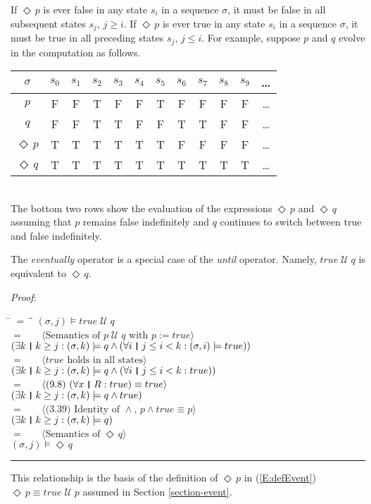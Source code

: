 \documentclass[12pt, fleqn, leqno]{article}
\newcommand{\lgap}{2pt}                             %
\newcommand{\lllgap}{12pt}                          %
\newcommand{\mymathindent}{24pt}                    %
\newcommand{\Until}{\;\mathcal{U}\;}
\newcommand{\Event}{\Diamond\,}
\newcommand{\myqed}{\rule[-.23ex]{1.2ex}{2.0ex}}
\newcommand{\myqedtab}{\hspace{384pt}}              %
\newcommand{\thedr}{\rule[-.25ex]{.32mm}{1.75ex}}   %
\newcommand{\dr}{\;\,\thedr\,\;}                    %
\newcommand{\rb}{:}                                 %
\newcommand{\all}{\forall}                          %
\newcommand{\ext}{\exists}                          %
\newcommand{\Gll} {\langle}                         %
\newcommand{\Ggg} {\rangle}                         %
\newcommand{\Hint}[1]     {\ \ \ $\Gll              \mbox{#1} \Ggg$ }   %
\begin{document}
If $\Event p$ is ever false in any state $s_i$ in a sequence $\sigma$, it must be false in all subsequent states $s_j$, $j\ge i$.
If $\Event p$ is ever true in any state $s_i$ in a sequence $\sigma$, it must be true in all preceding states $s_j$, $j\le i$.
For example, suppose $p$ and $q$ evolve in the computation as follows.\\[\lllgap]
\begin{tabular}{c|ccccccccccc}
  $\sigma$       & $s_0$ & $s_1$ & $s_2$ & $s_3$ & $s_4$ & $s_5$ & $s_6$ & $s_7$ & $s_8$& $s_9$  & \dots \\
  \hline
  $p$            & F     & F     & T     & F     & F     & T     & F     & F     & F     & F     &  \dots\\
  $q$            & F     & F     & T     & T     & F     & F     & T     & T     & F     & F     &  \dots\\
  $\Event p$     & T     & T     & T     & T     & T     & T     & F     & F     & F     & F     &  \dots\\
  $\Event q$     & T     & T     & T     & T     & T     & T     & T     & T     & T     & T     &  \dots\\
\end{tabular}\\[\lllgap]
The bottom two rows show the evaluation of the expressions $\Event p$ and $\Event q$
assuming that $p$ remains false indefinitely and $q$ continues to switch between true and false indefinitely.

The \textit{eventually} operator is a special case of the \textit{until} operator.
Namely, $true \Until q$ is equivalent to $\Event q$.

\emph{Proof}:
\begin{tabbing}
\hspace{\mymathindent} \= $= \;$ \= \myqedtab \= \kill
	\> \>   $(\sigma, j) \models true\Until q$\\[\lgap]
	\> $=$  \>  \Hint{Semantics of $p\Until q$ with $p:=true$}\\[\lgap]
	\> \>   $(\ext k \dr k \ge j \rb (\sigma,k) \models q \land (\all i \dr j\le i < k \rb (\sigma,i) \models true))$\\[\lgap]
	\> $=$  \>  \Hint{$true$ holds in all states}\\[\lgap]
	\> \>   $(\ext k \dr k \ge j \rb (\sigma,k) \models q \land (\all i \dr j\le i < k \rb true))$\\[\lgap]
	\> $=$  \>  \Hint{(9.8) $(\all x\dr R\rb true)\equiv true$}\\[\lgap]
	\> \>   $(\ext k \dr k \ge j \rb (\sigma,k) \models q \land true)$\\[\lgap]
	\> $=$  \>  \Hint{(3.39) Identity of $\land$, $p \land true \equiv p$}\\[\lgap]
	\> \>   $(\ext k \dr k \ge j \rb (\sigma,k) \models q)$\\[\lgap]
	\> $=$  \>  \Hint{Semantics of $\Event q$}\\[\lgap]
	\> \>   $(\sigma, j) \models \Event q$ \quad \myqed
\end{tabbing}
This relationship is the basis of the definition of $\Event p$ in (\ref{E:defEvent}) $\Event p \equiv true \Until p$
assumed in Section \ref{section-event}.
\end{document}
